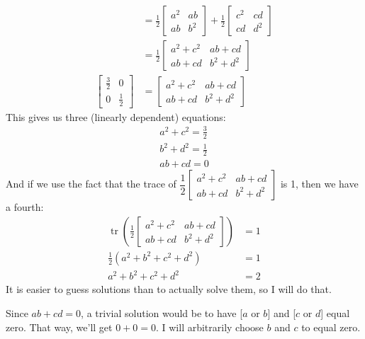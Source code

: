 \documentclass[11pt]{article}
\DeclareMathOperator{\tr}{tr}
\begin{document}
\begin{enumerate}[label=\textbf{\arabic*.}, start=2]
{\begin{enumerate}[label=\textbf{(\alph*)}]
{\begin{align*}
                        &=\frac 1 2 \begin{bmatrix}a^2 & ab \\ ab & b^2\end{bmatrix}+\frac 1 2 \begin{bmatrix}c^2 & cd \\ cd & d^2\end{bmatrix} \\
                        &=\frac 1 2 \begin{bmatrix}a^2+c^2 & ab+cd \\ ab+cd & b^2+d^2\end{bmatrix} \\
                        \begin{bmatrix}\frac 3 2 & 0 \\ 0 & \frac 1 2\end{bmatrix}&=\begin{bmatrix}a^2+c^2 & ab+cd \\ ab+cd & b^2+d^2\end{bmatrix}
                    \end{align*}
                    This gives us three (linearly dependent) equations:
                    \begin{gather*}
                        a^2+c^2=\frac 3 2 \\
                        b^2+d^2=\frac 1 2 \\
                        ab+cd=0
                    \end{gather*}
                    And if we use the fact that the trace of \(\dfrac 1 2 \begin{bmatrix}a^2+c^2 & ab+cd \\ ab+cd & b^2+d^2\end{bmatrix}\) is 1, then we have a fourth:
                    \begin{align*}
                        \tr\left(\frac 1 2 \begin{bmatrix}a^2+c^2 & ab+cd \\ ab+cd & b^2+d^2\end{bmatrix}\right)&=1 \\
                        \frac 1 2 (a^2+b^2+c^2+d^2)&=1 \\
                        a^2+b^2+c^2+d^2&=2
                    \end{align*}
                    It is easier to guess solutions than to actually solve them, so I will do that.
                    \par
                    Since \(ab+cd=0\), a trivial solution would be to have [\(a\) or \(b\)] and [\(c\) or \(d\)] equal zero. That way, we'll get \(0+0=0\). I will arbitrarily choose \(b\) and \(c\) to equal zero.
}
\end{enumerate}}
\end{enumerate}
\end{document}
